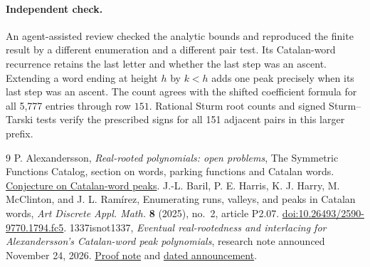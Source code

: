 \documentclass[11pt]{article}
\begin{document}
\begin{samepage}
\paragraph{Independent check.}
An agent-assisted review checked the analytic bounds and reproduced the finite result by a different enumeration and a different pair test. Its Catalan-word recurrence retains the last letter and whether the last step was an ascent. Extending a word ending at height \(h\) by \(k<h\) adds one peak precisely when its last step was an ascent. The count agrees with the shifted coefficient formula for all 5,777 entries through row \(151\). Rational Sturm root counts and signed Sturm--Tarski tests verify the prescribed signs for all 151 adjacent pairs in this larger prefix.

\end{samepage}

\begin{thebibliography}{9}
 P. Alexandersson, \emph{Real-rooted polynomials: open problems}, The Symmetric Functions Catalog, section on words, parking functions and Catalan words. \href{https://www.symmetricfunctions.com/realRootedOpenProblems.htm\#conjCatalanWordPeaks}{Conjecture on Catalan-word peaks}.
 J.-L. Baril, P. E. Harris, K. J. Harry, M. McClinton, and J. L. Ram\'irez, Enumerating runs, valleys, and peaks in Catalan words, \emph{Art Discrete Appl. Math.} \textbf{8} (2025), no.~2, article P2.07. \href{https://doi.org/10.26493/2590-9770.1794.fc5}{doi:10.26493/2590-9770.1794.fc5}.
 1337isnot1337, \emph{Eventual real-rootedness and interlacing for Alexandersson's Catalan-word peak polynomials}, research note announced November 24, 2026. \href{https://github.com/1337isnot1337/solved-conjectures/blob/research/research/alexandersson-catalan-peaks/EVENTUAL-ZEROS.md}{Proof note} and \href{https://github.com/1337isnot1337/solved-conjectures/issues/59\#issuecomment-7134751818}{dated announcement}.
\end{thebibliography}
\end{document}

